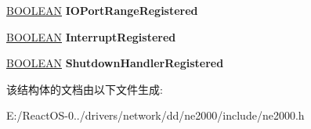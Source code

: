 \begin{DoxyCompactItemize}
\item 
\mbox{\label{struct___n_i_c___a_d_a_p_t_e_r_a548edd34287429bb1eb14878f6585745}} 
\hyperlink{_processor_bind_8h_a112e3146cb38b6ee95e64d85842e380a}{B\+O\+O\+L\+E\+AN} {\bfseries I\+O\+Port\+Range\+Registered}
\item 
\mbox{\label{struct___n_i_c___a_d_a_p_t_e_r_a4d035414f0066c45af22b1ad929d19d1}} 
\hyperlink{_processor_bind_8h_a112e3146cb38b6ee95e64d85842e380a}{B\+O\+O\+L\+E\+AN} {\bfseries Interrupt\+Registered}
\item 
\mbox{\label{struct___n_i_c___a_d_a_p_t_e_r_af4cc6bda2f082d95e0112b3d4c7a5585}} 
\hyperlink{_processor_bind_8h_a112e3146cb38b6ee95e64d85842e380a}{B\+O\+O\+L\+E\+AN} {\bfseries Shutdown\+Handler\+Registered}
\end{DoxyCompactItemize}


该结构体的文档由以下文件生成\+:\begin{DoxyCompactItemize}
\item 
E\+:/\+React\+O\+S-\/0../drivers/network/dd/ne2000/include/ne2000.\+h\end{DoxyCompactItemize}
